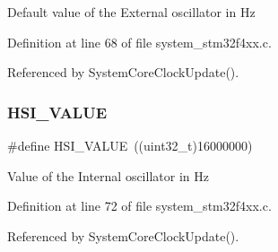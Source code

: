 Default value of the External oscillator in Hz 

Definition at line 68 of file system\+\_\+stm32f4xx.\+c.



Referenced by System\+Core\+Clock\+Update().

\mbox{\label{group___s_t_m32_f4xx___system___private___includes_gaaa8c76e274d0f6dd2cefb5d0b17fbc37}} 
\subsubsection{\texorpdfstring{H\+S\+I\+\_\+\+V\+A\+L\+UE}{HSI\_VALUE}}
{\footnotesize\ttfamily \#define H\+S\+I\+\_\+\+V\+A\+L\+UE~((uint32\+\_\+t)16000000)}

Value of the Internal oscillator in Hz 

Definition at line 72 of file system\+\_\+stm32f4xx.\+c.



Referenced by System\+Core\+Clock\+Update().

